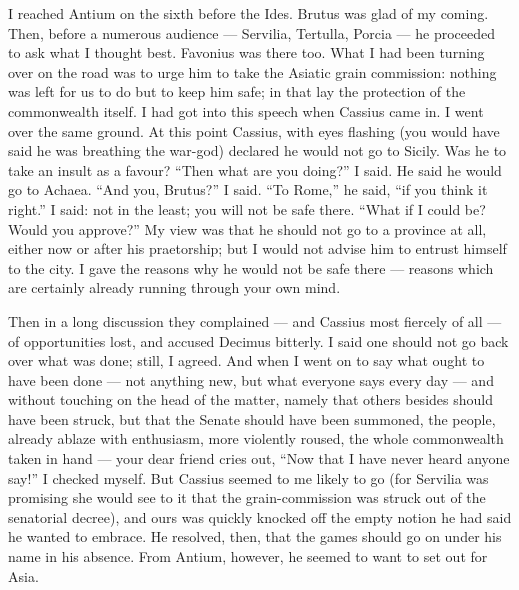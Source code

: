 

 I reached Antium on the sixth before the Ides. Brutus was glad of my coming. Then, before a numerous audience --- Servilia, Tertulla, Porcia --- he proceeded to ask what I thought best. Favonius was there too. What I had been turning over on the road was to urge him to take the Asiatic grain commission: nothing was left for us to do but to keep him safe; in that lay the protection of the commonwealth itself. I had got into this speech when Cassius came in. I went over the same ground. At this point Cassius, with eyes flashing (you would have said he was breathing the war-god) declared he would not go to Sicily. Was he to take an insult as a favour? \enquote{Then what are you doing?} I said. He said he would go to Achaea. \enquote{And you, Brutus?} I said. \enquote{To Rome,} he said, \enquote{if you think it right.} I said: not in the least; you will not be safe there. \enquote{What if I could be? Would you approve?} My view was that he should not go to a province at all, either now or after his praetorship; but I would not advise him to entrust himself to the city. I gave the reasons why he would not be safe there --- reasons which are certainly already running through your own mind.

 Then in a long discussion they complained --- and Cassius most fiercely of all --- of opportunities lost, and accused Decimus bitterly. I said one should not go back over what was done; still, I agreed. And when I went on to say what ought to have been done --- not anything new, but what everyone says every day --- and without touching on the head of the matter, namely that others besides should have been struck, but that the Senate should have been summoned, the people, already ablaze with enthusiasm, more violently roused, the whole commonwealth taken in hand --- your dear friend cries out, \enquote{Now that I have never heard anyone say!} I checked myself. But Cassius seemed to me likely to go (for Servilia was promising she would see to it that the grain-commission was struck out of the senatorial decree), and ours was quickly knocked off the empty notion he had \dag said he wanted to embrace\dag. He resolved, then, that the games should go on under his name in his absence. From Antium, however, he seemed to want to set out for Asia.

